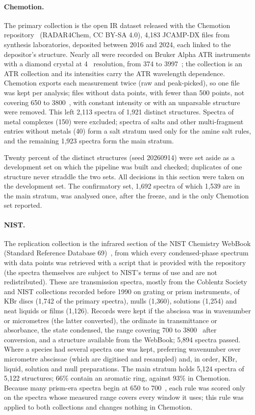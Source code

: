 \paragraph{Chemotion.} The primary collection is the open IR dataset released with the Chemotion repository~\cite{punjabi2025chemotion} (RADAR4Chem, CC BY-SA 4.0), 4,183 JCAMP-DX files from synthesis laboratories, deposited between 2016 and 2024, each linked to the depositor's structure. Nearly all were recorded on Bruker Alpha ATR instruments with a diamond crystal at 4~\wn{} resolution, from 374 to 3997~\wn{}; the collection is an ATR collection and its intensities carry the ATR wavelength dependence. Chemotion exports each measurement twice (raw and peak-picked), so one file was kept per analysis; files without data points, with fewer than 500 points, not covering 650 to 3800~\wn{}, with constant intensity or with an unparsable structure were removed. This left 2,113 spectra of 1,921 distinct structures. Spectra of metal complexes (150) were excluded; spectra of salts and other multi-fragment entries without metals (40) form a salt stratum used only for the amine salt rules, and the remaining 1,923 spectra form the main stratum.

Twenty percent of the distinct structures (seed 20260914) were set aside as a development set on which the pipeline was built and checked; duplicates of one structure never straddle the two sets. All decisions in this section were taken on the development set. The confirmatory set, 1,692 spectra of which 1,539 are in the main stratum, was analysed once, after the freeze, and is the only Chemotion set reported.

\paragraph{NIST.} The replication collection is the infrared section of the NIST Chemistry WebBook (Standard Reference Database 69)~\cite{nist_webbook}, from which every condensed-phase spectrum with data points was retrieved with a script that is provided with the repository (the spectra themselves are subject to NIST's terms of use and are not redistributed). These are transmission spectra, mostly from the Coblentz Society and NIST collections recorded before 1990 on grating or prism instruments, of KBr discs (1,742 of the primary spectra), mulls (1,360), solutions (1,254) and neat liquids or films (1,126). Records were kept if the abscissa was in wavenumber or micrometres (the latter converted), the ordinate in transmittance or absorbance, the state condensed, the range covering 700 to 3800~\wn{} after conversion, and a structure available from the WebBook; 5,894 spectra passed. Where a species had several spectra one was kept, preferring wavenumber over micrometre abscissae (which are digitised and resampled) and, in order, KBr, liquid, solution and mull preparations. The main stratum holds 5,124 spectra of 5,122 structures; 66\% contain an aromatic ring, against 93\% in Chemotion. Because many prism-era spectra begin at 650 to 700~\wn{}, each rule was scored only on the spectra whose measured range covers every window it uses; this rule was applied to both collections and changes nothing in Chemotion.

